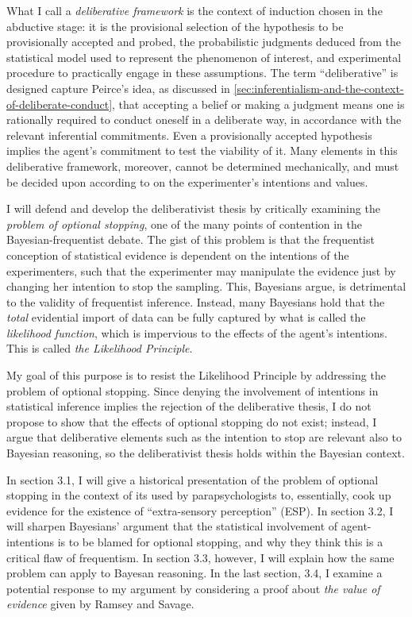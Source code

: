 What I call a \emph{deliberative framework} is the context of induction chosen in the
abductive stage: it is the provisional selection of the hypothesis to be provisionally
accepted and probed, the probabilistic judgments deduced from the
statistical model used to represent the phenomenon of interest, and
experimental procedure to practically engage in these assumptions. The
term ``deliberative'' is designed capture Peirce's idea, as discussed in \ref{sec:inferentialism-and-the-context-of-deliberate-conduct}, that accepting a
belief or making a judgment means one is rationally required to conduct oneself in
a deliberate way, in accordance with the relevant inferential commitments. Even a provisionally accepted hypothesis implies the agent's commitment to test the viability of it. Many elements in this deliberative framework, moreover, cannot be determined mechanically, and must be decided upon according to on the experimenter's intentions and values.

I will defend and develop the deliberativist thesis by critically
examining the \emph{problem of optional stopping}, one of the many points of
contention in the Bayesian-frequentist debate. The gist of this problem
is that the frequentist conception of statistical evidence is dependent
on the intentions of the experimenters, such that the experimenter may
manipulate the evidence just by changing her intention to stop the
sampling. This, Bayesians argue, is detrimental to the validity of
frequentist inference. Instead, many Bayesians hold that the \emph{total} evidential
import of data can be fully captured by what is called the
\emph{likelihood function}, which is impervious to the effects of the
agent's intentions. This is called \emph{the Likelihood Principle}.

My goal of this purpose is to resist the Likelihood Principle by
addressing the problem of optional stopping. Since denying the involvement of intentions in statistical inference implies the rejection of the deliberative thesis, I do not propose to show that the effects of optional stopping do not exist; instead, I argue that deliberative elements such as the intention to stop are relevant also to Bayesian reasoning, so the deliberativist thesis holds within the
Bayesian context.

In section 3.1, I will give a historical presentation of the problem of
optional stopping in the context of its used by
parapsychologists to, essentially, cook up evidence for the existence of
``extra-sensory perception'' (ESP). In section 3.2, I will sharpen
Bayesians' argument that the statistical involvement of agent-intentions is to be blamed for optional stopping, and why
they think this is a critical flaw of frequentism. In section 3.3,
however, I will explain how the same problem can apply to Bayesan
reasoning. In the last section, 3.4, I examine a potential response to
my argument by considering a proof about \emph{the value of evidence}
given by Ramsey and Savage.

